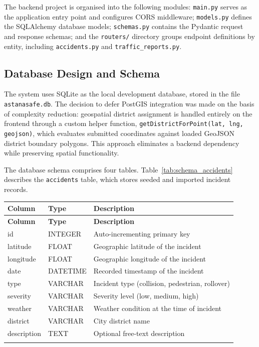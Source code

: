 \documentclass[12pt,a4paper]{report}
\begin{document}
The backend project is organised into the following modules: \texttt{main.py} serves as the application entry point and configures CORS middleware; \texttt{models.py} defines the SQLAlchemy database models; \texttt{schemas.py} contains the Pydantic request and response schemas; and the \texttt{routers/} directory groups endpoint definitions by entity, including \texttt{accidents.py} and \texttt{traffic\_reports.py}.

\subsection{Database Design and Schema}

The system uses SQLite as the local development database, stored in the file \texttt{astanasafe.db}. The decision to defer PostGIS integration was made on the basis of complexity reduction: geospatial district assignment is handled entirely on the frontend through a custom helper function, \texttt{getDistrictForPoint(lat, lng, geojson)}, which evaluates submitted coordinates against loaded GeoJSON district boundary polygons. This approach eliminates a backend dependency while preserving spatial functionality.

The database schema comprises four tables. Table~\ref{tab:schema_accidents} describes the \texttt{accidents} table, which stores seeded and imported incident records.

\renewcommand{\arraystretch}{1.4}

\begin{tabularx}{\textwidth}{|p{3.0cm}
                  |p{3 cm}
                  |X|}


\hline
\textbf{Column} & \textbf{Type} & \textbf{Description} \\
\hline
\endfirsthead

\hline
\textbf{Column} & \textbf{Type} & \textbf{Description} \\
\hline
\endhead

id & INTEGER & Auto-incrementing primary key \\
\hline
latitude & FLOAT & Geographic latitude of the incident \\
\hline
longitude & FLOAT & Geographic longitude of the incident \\
\hline
date & DATETIME & Recorded timestamp of the incident \\
\hline
type & VARCHAR & Incident type (collision, pedestrian, rollover) \\
\hline
severity & VARCHAR & Severity level (low, medium, high) \\
\hline
weather & VARCHAR & Weather condition at the time of incident \\
\hline
district & VARCHAR & City district name \\
\hline
description & TEXT & Optional free-text description \\
\hline

\caption{\centering Database schema: \texttt{accidents} table}
\label{tab:schema_accidents} \\

\end{tabularx}
\end{document}
